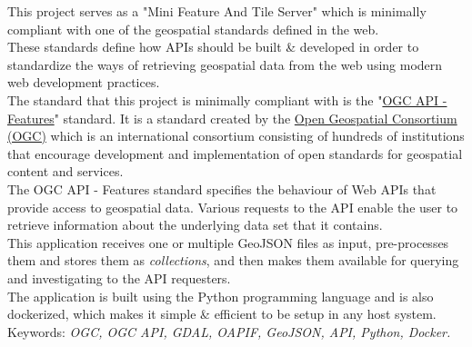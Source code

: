 This project serves as a "Mini Feature And Tile Server" which is minimally compliant with one of the geospatial standards defined in the web.\\
These standards define how APIs should be built \& developed in order to standardize the ways of retrieving geospatial data from the web using modern web development practices.\\
\newline
The standard that this project is minimally compliant with is the "\href{https://docs.opengeospatial.org/DRAFTS/17-069r1.html}{OGC API - Features}" standard. It is a standard created by the \href{https://www.opengeospatial.org/}{Open Geospatial Consortium (OGC)} which is an international consortium consisting of hundreds of institutions that encourage development and implementation of open standards for geospatial content and services. \\
The OGC API - Features standard specifies the behaviour of Web APIs that provide access to geospatial data. Various requests to the API enable the user to retrieve information about the underlying data set that it contains.\\
This application receives one or multiple GeoJSON files as input, pre-processes them and stores them as \textit{collections}, and then makes them available for querying and investigating to the API requesters.\\

The application is built using the Python programming language and is also dockerized, which makes it simple \& efficient to be setup in any host system.\\
\newline
Keywords: \textit{OGC, OGC API, GDAL, OAPIF, GeoJSON, API, Python, Docker.}
